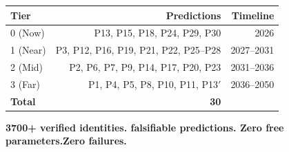 \begin{center}
\begin{tabular}{lrr}
  \hline
  Tier & Predictions & Timeline \\
  \hline
  0 (Now) & P13, P15, P18, P24, P29, P30 & 2026 \\
  1 (Near) & P3, P12, P16, P19, P21, P22, P25--P28 & 2027--2031 \\
  2 (Mid) & P2, P6, P7, P9, P14, P17, P20, P23 & 2031--2036 \\
  3 (Far) & P1, P4, P5, P8, P10, P11, P13$'$ & 2036--2050 \\
  \hline
  \textbf{Total} & \textbf{30} & \\
  \hline
\end{tabular}
\end{center}

\begin{center}
  \textbf{3700+ verified identities. falsifiable predictions.
  \quad Zero free parameters.\quad Zero failures.}
\end{center}
